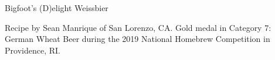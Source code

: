 \begin{recipe}{Bigfoot's (D)elight Weissbier}

\begin{aboutblock}
Recipe by Sean Manrique of San Lorenzo, CA. Gold medal in Category 7: German
Wheat Beer during the 2019 National Homebrew Competition in Providence, RI.
\sourceaha
\end{aboutblock}


\begin{methodandtiming}
 
\begin{mashsteps}
\end{mashsteps}

\begin{fermentationsteps}
\end{fermentationsteps}

\end{methodandtiming}

\recipebreak

\begin{ingredientsblock}

\begin{malts}
\end{malts}

\begin{hops}
\end{hops}


\end{ingredientsblock}

\end{recipe}

